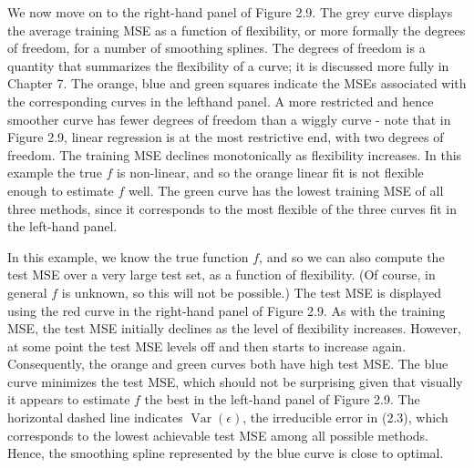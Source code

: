 \documentclass[10pt]{article}
\begin{document}

We now move on to the right-hand panel of Figure 2.9. The grey curve displays the average training MSE as a function of flexibility, or more formally the degrees of freedom, for a number of smoothing splines. The degrees of freedom is a quantity that summarizes the flexibility of a curve; it is discussed more fully in Chapter 7. The orange, blue and green squares indicate the MSEs associated with the corresponding curves in the lefthand panel. A more restricted and hence smoother curve has fewer degrees of freedom than a wiggly curve - note that in Figure 2.9, linear regression is at the most restrictive end, with two degrees of freedom. The training MSE declines monotonically as flexibility increases. In this example the true $f$ is non-linear, and so the orange linear fit is not flexible enough to estimate $f$ well. The green curve has the lowest training MSE of all three methods, since it corresponds to the most flexible of the three curves fit in the left-hand panel.

In this example, we know the true function $f$, and so we can also compute the test MSE over a very large test set, as a function of flexibility. (Of course, in general $f$ is unknown, so this will not be possible.) The test MSE is displayed using the red curve in the right-hand panel of Figure 2.9. As with the training MSE, the test MSE initially declines as the level of flexibility increases. However, at some point the test MSE levels off and then starts to increase again. Consequently, the orange and green curves both have high test MSE. The blue curve minimizes the test MSE, which should not be surprising given that visually it appears to estimate $f$ the best in the left-hand panel of Figure 2.9. The horizontal dashed line indicates $\operatorname{Var}(\epsilon)$, the irreducible error in (2.3), which corresponds to the lowest achievable test MSE among all possible methods. Hence, the smoothing spline represented by the blue curve is close to optimal.
\end{document}
